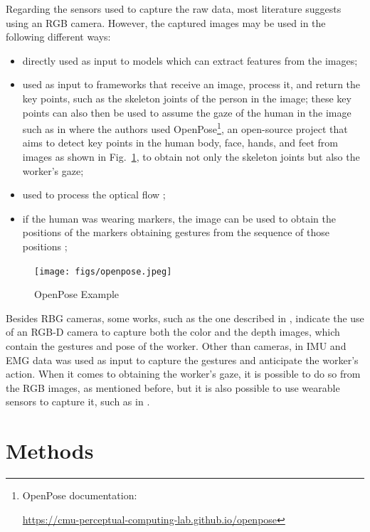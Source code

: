 \documentclass[conference]{IEEEtran}
\begin{document}
Regarding the sensors used to capture the raw data, most literature suggests using an RGB camera. However, the captured images may be used in the following different ways:

\begin{itemize}
\item directly used as input to models which can extract features from the images;

\item used as input to frameworks that receive an image, process it, and return the key points, such as the skeleton joints of the person in the image; these key points can also then be used to assume the gaze of the human in the image such as in \textcite{Canuto2021} where the authors used OpenPose\cite{Cao2021,Simon2017,Cao2018,Wei2016}\footnote{OpenPose documentation:

\url{https://cmu-perceptual-computing-lab.github.io/openpose}}, an open-source project that aims to detect key points in the human body, face, hands, and feet from images as shown in Fig.~\ref{openpose}, to obtain not only the skeleton joints but also the worker’s gaze;

\item used to process the optical flow \cite{Gammulle2019, Wu2021, Rodriguez2019, Furnari2021};

\item if the human was wearing markers, the image can be used to obtain the positions of the markers obtaining gestures from the sequence of those positions \cite{Maeda2016};
\end{itemize}

\begin{figure}[htbp]
\centerline{\texttt{[image: figs/openpose.jpeg]}}
\caption[OpenPose Example]{OpenPose Example \cite{Cao2021}}
\label{openpose}
\end{figure}

Besides RBG cameras, some works, such as the one described in \textcite{Moutinho2023}, indicate the use of an RGB-D camera to capture both the color and the depth images, which contain the gestures and pose of the worker. Other than cameras, in \textcite{Tortora2019} IMU and EMG data was used as input to capture the gestures and anticipate the worker’s action. When it comes to obtaining the worker’s gaze, it is possible to do so from the RGB images, as mentioned before, but it is also possible to use wearable sensors to capture it, such as in \textcite{Schydlo2018}.

\section{Methods}
\label{chapter:methods}
\end{document}
